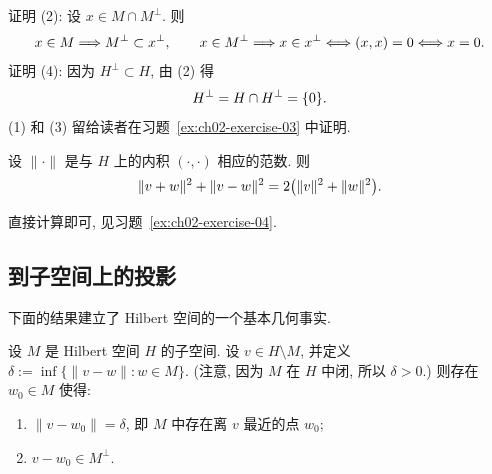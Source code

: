 \begin{Proof}
证明 (2): 设 $x\in M\cap M^\perp$. 则
\[
\MathBookFormulaID{formula-ch02-orthogonal-property-two-proof}
x\in M\Longrightarrow M^\perp\subset x^\perp,
\qquad
x\in M^\perp\Longrightarrow x\in x^\perp
\Longleftrightarrow(x,x)=0\Longleftrightarrow x=0.
\]
证明 (4): 因为 $H^\perp\subset H$, 由 (2) 得
\[
\MathBookFormulaID{formula-ch02-h-orthogonal-zero}
H^\perp=H\cap H^\perp=\{0\}.
\]
(1) 和 (3) 留给读者在习题~\ref{ex:ch02-exercise-03} 中证明.
\end{Proof}

\setcounter{thmcount}{7}
\begin{Theorem}[平行四边形法则]
\label{thm:ch02-parallelogram-law}
设 $\|\cdot\|$ 是与 $H$ 上的内积 $(\cdot,\cdot)$ 相应的范数. 则
\setcounter{equation}{8}
\begin{equation}
\MathBookFormulaID{formula-ch02-parallelogram-law}
\|v+w\|^2+\|v-w\|^2=2\bigl(\|v\|^2+\|w\|^2\bigr).
\label{eq:ch02-parallelogram-law}
\end{equation}
\end{Theorem}

\begin{Proof}
直接计算即可, 见习题~\ref{ex:ch02-exercise-04}.
\end{Proof}

\subsection{到子空间上的投影}
\label{sec:ch02-projections-subspaces}
\setcounter{thmcount}{0}
\setcounter{equation}{0}

下面的结果建立了 Hilbert 空间的一个基本几何事实.

\begin{Proposition}
\label{prop:ch02-closest-point-projection}
设 $M$ 是 Hilbert 空间 $H$ 的子空间. 设 $v\in H\setminus M$, 并定义 $\delta:=\inf\{\|v-w\|:w\in M\}$. (注意, 因为 $M$ 在 $H$ 中闭, 所以 $\delta>0$.) 则存在 $w_0\in M$ 使得:
\begin{enumerate}
\item[(i)] $\|v-w_0\|=\delta$, 即 $M$ 中存在离 $v$ 最近的点 $w_0$;
\item[(ii)] $v-w_0\in M^\perp$.
\end{enumerate}
\end{Proposition}

